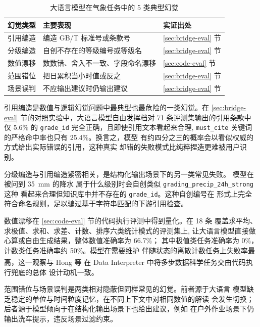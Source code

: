 \documentclass[a4paper]{article}
\newcommand{\song}{\CJKfamily{song}}
\theoremstyle{definition}
\theoremstyle{plain}
\theoremstyle{remark}
\let\oldcite\cite
\renewcommand{\cite}[1]{\textsuperscript{\oldcite{#1}}}
\newcommand{\bk}{\discretionary{}{}{}}
\begin{document}
\begin{table}[!ht]
    \centering
    \caption{大语言模型在气象任务中的 5 类典型幻觉}
    \label{tab:hallucination-types}
    \song\fontsize{9pt}{12pt}\selectfont
    \renewcommand{\arraystretch}{0.95}
    \begin{tabular}{lll}
        \toprule
        幻觉类型 & 主要表现 & 实证出处 \\
        \midrule
        引用编造 & 编造 GB/T 标准号或条款号 & \ref{sec:bridge-eval} 节 \\
        分级编造 & 自创不存在的等级编号或等级名 & \ref{sec:bridge-eval} 节 \\
        数值漂移 & 数数错、舍入不一致、字段命名漂移 & \ref{sec:code-eval} 节 \\
        范围错位 & 把日累积当小时值或反之 & \ref{sec:bridge-eval} 节 \\
        场景误判 & 不应输出建议时仍输出建议 & \ref{sec:bridge-eval} 节 \\
        \bottomrule
    \end{tabular}
\end{table}

引用编造是数值与逻辑幻觉问题中最典型也最危险的一类幻觉。在
\ref{sec:bridge-eval}
节的对照实验中，大语言模型自由发挥档对 71 条评测集输出的引用条款中
仅 5.6\% 的 \texttt{grade\_\bk{}id} 完全正确，且即使引用文本看起来合理,
\texttt{must\_\bk{}cite} 关键词的严格命中率也只有 25.4\%。换言之，模型
有约四分之三的概率会以看似权威的方式给出实际错误的引用，这种真实
却错的失败模式比纯粹捏造更难被用户识别。

分级编造与引用编造紧密相关，是结构化输出场景下的另一类常见失败。
模型在被问到 \SI{35}{mm} 的降水
属于什么级别时会自创类似 \texttt{grading\_\bk{}precip\_\bk{}24h\_\bk{}strong} 这种
看起来合理但知识库中并不存在的 \texttt{grade\_\bk{}id}。这种自创编号在
形式上完全符合命名规则，足以骗过基于字符串匹配的下游引用检查。

数值漂移在 \ref{sec:code-eval} 节的代码执行评测中得到量化。在 18 条
覆盖求平均、求极值、求和、求差、计数、排序六类统计模式的评测集上,
让大语言模型直接做心算或自由生成结果，整体数值准确率为 66.7\%；
其中极值类任务准确率为 0\%，计数类任务准确率约 50\%。模型在需要维护
伴随状态的离散计数任务上失败率最高，这一观察与 Hong 等 \cite{ref20}
在 Data Interpreter 中将多步数据科学任务交由代码执行兜底的总体
设计动机一致。

范围错位与场景误判是两类相对隐蔽但同样常见的幻觉。前者源于大语言
模型缺乏稳定的单位与时间粒度记忆，在不同上下文中对相同数值的解读
会发生切换；后者源于模型倾向于在结构化输出场景下也给出建议，例如
在户外作业场景下仍输出洗车提示，违反场景过滤约束。
\end{document}
